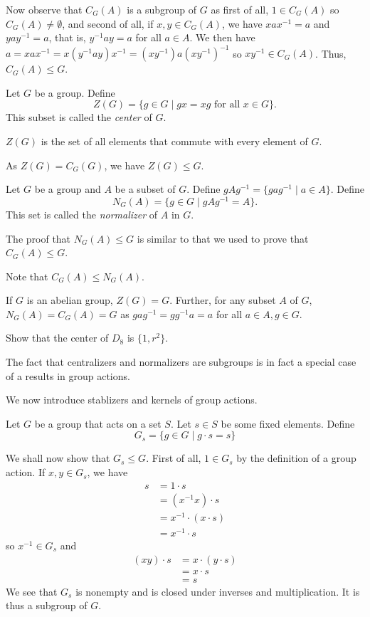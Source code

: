 Now observe that $C_G(A)$ is a subgroup of $G$ as first of all, $1\in C_G(A)$ so $C_G(A)\neq\emptyset$, and second of all, if $x,y\in C_G(A)$, we have $xax^{-1}=a$ and $yay^{-1}=a$, that is, $y^{-1}ay=a$ for all $a\in A$. We then have $a=xax^{-1}=x(y^{-1}ay)x^{-1}=(xy^{-1})a(xy^{-1})^{-1}$ so $xy^{-1}\in C_G(A)$. Thus, $C_G(A)\leq G$.

\begin{definition}
    Let $G$ be a group. Define
    $$Z(G)=\{g\in G\mid gx=xg\text{ for all }x\in G\}.$$
    This subset is called the \textit{center} of $G$.
\end{definition}

$Z(G)$ is the set of all elements that commute with every element of $G$.

As $Z(G)=C_G(G)$, we have $Z(G)\leq G$.

\begin{definition}
    Let $G$ be a group and $A$ be a subset of $G$. Define $gAg^{-1}=\{gag^{-1}\mid a\in A\}$. Define
    $$N_G(A)=\{g\in G\mid gAg^{-1}=A\}.$$
    This set is called the \textit{normalizer} of $A$ in $G$.
\end{definition}

The proof that $N_G(A)\leq G$ is similar to that we used to prove that $C_G(A)\leq G$.

Note that $C_G(A)\leq N_G(A)$.

\vspace{2mm}
If $G$ is an abelian group, $Z(G)=G$. Further, for any subset $A$ of $G$, $N_G(A)=C_G(A)=G$ as $gag^{-1}=gg^{-1}a=a$ for all $a\in A, g\in G$.

\begin{exercise}
    Show that the center of $D_8$ is $\{1,r^2\}$.
\end{exercise}

The fact that centralizers and normalizers are subgroups is in fact a special case of a results in group actions. 

We now introduce stablizers and kernels of group actions.

\begin{definition}
    Let $G$ be a group that acts on a set $S$. Let $s\in S$ be some fixed elements. Define
    $$G_s=\{g\in G\mid g\cdot s=s\}$$
\end{definition}

We shall now show that $G_s\leq G$. First of all, $1\in G_s$ by the definition of a group action. If $x,y\in G_s$, we have
\begin{align*}
    s &= 1\cdot s \\
      &= (x^{-1}x)\cdot s \\
      &= x^{-1}\cdot (x\cdot s) \\
      &= x^{-1}\cdot s
\end{align*}
so $x^{-1}\in G_s$ and
\begin{align*}
    (xy)\cdot s &= x\cdot(y\cdot s) \\
                &= x\cdot s \\
                &= s
\end{align*}
We see that $G_s$ is nonempty and is closed under inverses and multiplication. It is thus a subgroup of $G$.

